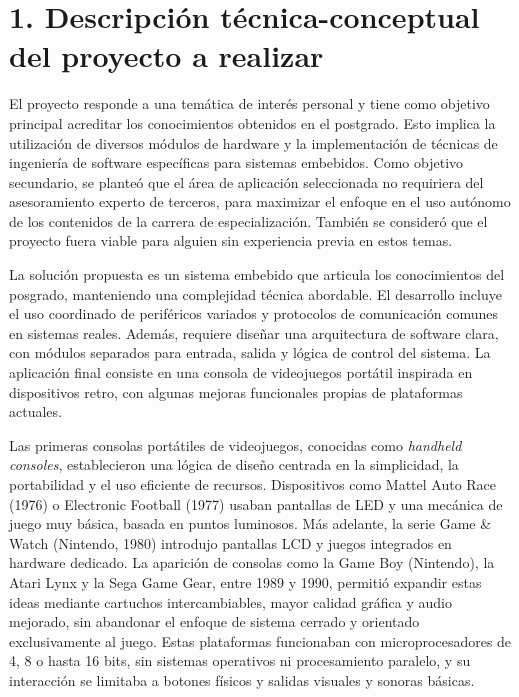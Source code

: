 \documentclass[
11pt, %
]{charter}
\begin{document}
\section{1. Descripción técnica-conceptual del proyecto a realizar}
\label{sec:descripcion}

El proyecto responde a una temática de interés personal y tiene como objetivo principal acreditar los conocimientos obtenidos en el postgrado. Esto implica la utilización de diversos módulos de hardware y la implementación de técnicas de ingeniería de software específicas para sistemas embebidos. Como objetivo secundario, se planteó que el área de aplicación seleccionada no requiriera del asesoramiento experto de terceros, para maximizar el enfoque en el uso autónomo de los contenidos de la carrera de especialización. También se consideró que el proyecto fuera viable para alguien sin experiencia previa en estos temas.

La solución propuesta es un sistema embebido que articula los conocimientos del posgrado, manteniendo una complejidad técnica abordable. El desarrollo incluye el uso coordinado de periféricos variados y protocolos de comunicación comunes en sistemas reales. Además, requiere diseñar una arquitectura de software clara, con módulos separados para entrada, salida y lógica de control del sistema. La aplicación final consiste en una consola de videojuegos portátil inspirada en dispositivos retro, con algunas mejoras funcionales propias de plataformas actuales.

Las primeras consolas portátiles de videojuegos, conocidas como \textit{handheld consoles}, establecieron una lógica de diseño centrada en la simplicidad, la portabilidad y el uso eficiente de recursos. Dispositivos como Mattel Auto Race (1976) o Electronic Football (1977) usaban pantallas de LED y una mecánica de juego muy básica, basada en puntos luminosos. Más adelante, la serie Game \& Watch (Nintendo, 1980) introdujo pantallas LCD y juegos integrados en hardware dedicado. La aparición de consolas como la Game Boy (Nintendo), la Atari Lynx y la Sega Game Gear, entre 1989 y 1990, permitió expandir estas ideas mediante cartuchos intercambiables, mayor calidad gráfica y audio mejorado, sin abandonar el enfoque de sistema cerrado y orientado exclusivamente al juego. Estas plataformas funcionaban con microprocesadores de 4, 8 o hasta 16 bits, sin sistemas operativos ni procesamiento paralelo, y su interacción se limitaba a botones físicos y salidas visuales y sonoras básicas.
\end{document}
